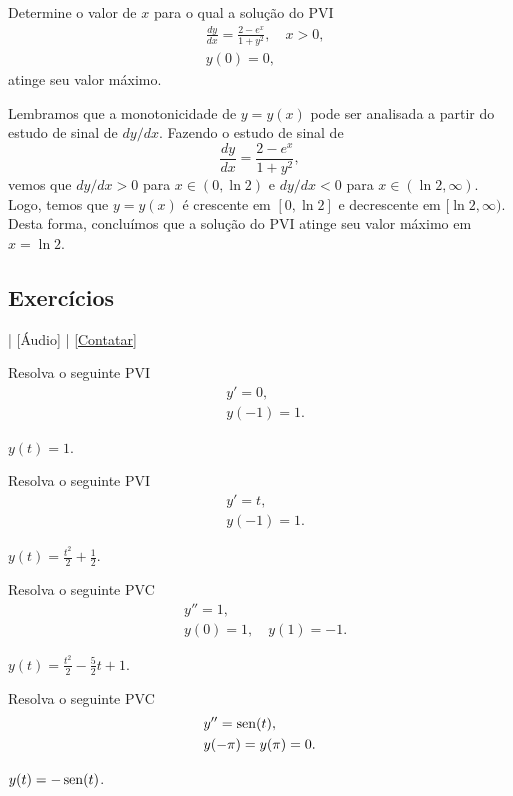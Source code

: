 \begin{exeresol}
  Determine o valor de $x$ para o qual a solução do PVI
  \begin{align}
    &\frac{dy}{dx} = \frac{2-e^x}{1 + y^2},\quad x>0,\\
    &y(0)=0,
  \end{align}
  atinge seu valor máximo.
\end{exeresol}
\begin{resol}
  Lembramos que a monotonicidade de $y = y(x)$ pode ser analisada a partir do estudo de sinal de $dy/dx$. Fazendo o estudo de sinal de
  \begin{equation}
    \frac{dy}{dx} = \frac{2-e^x}{1+y^2},
  \end{equation}
  vemos que $dy/dx > 0$ para $x\in (0, \ln 2)$ e $dy/dx < 0$ para $x\in (\ln 2, \infty)$. Logo, temos que $y = y(x)$ é crescente em $[0, \ln 2]$ e decrescente em $[\ln 2, \infty)$. Desta forma, concluímos que a solução do PVI atinge seu valor máximo em $x = \ln 2$.
\end{resol}

\subsection*{Exercícios}

\begin{flushright}
  [Vídeo] | [Áudio] | \href{https://phkonzen.github.io/notas/contato.html}{[Contatar]}
\end{flushright}

\begin{exer}
  Resolva o seguinte PVI
  \begin{align}
    &y' = 0,\\
    &y(-1) = 1.
  \end{align}
\end{exer}
\begin{resp}
  $y(t) = 1$.
\end{resp}

\begin{exer}
  Resolva o seguinte PVI
  \begin{align}
    &y' = t,\\
    &y(-1) = 1.
  \end{align}
\end{exer}
\begin{resp}
  $y(t) = \frac{t^2}{2} + \frac{1}{2}$.
\end{resp}

\begin{exer}
  Resolva o seguinte PVC
  \begin{align}
    &y'' = 1,\\
    &y(0)=1,\quad y(1)=-1.
  \end{align}
\end{exer}
\begin{resp}
  $y(t) = \frac{t^2}{2} - \frac{5}{2}t + 1$.
\end{resp}

\begin{exer}
  Resolva o seguinte PVC
  \begin{align}
    &y'' = \operatorname{sen}(t),\\
    &y(-\pi)=y(\pi)=0.
  \end{align}
\end{exer}
\begin{resp}
  $y(t) = -\operatorname{sen}(t)$.
\end{resp}
